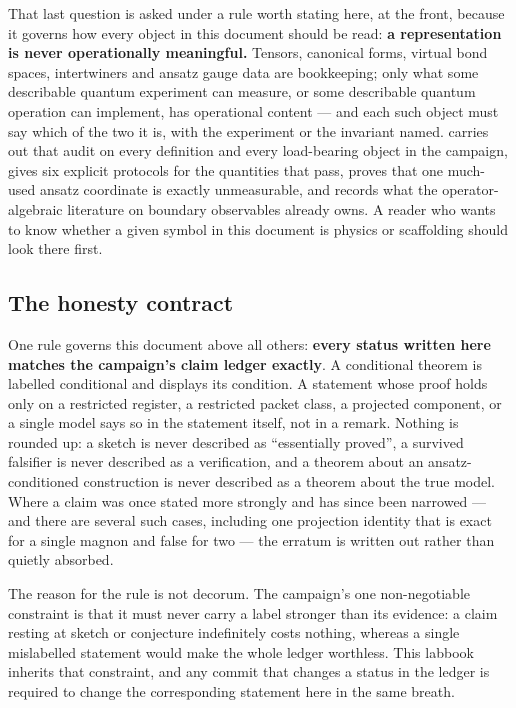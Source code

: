 That last question is asked under a rule worth stating here, at the front,
because it governs how every object in this document should be read: \textbf{a
representation is never operationally meaningful.} Tensors, canonical forms,
virtual bond spaces, intertwiners and ansatz gauge data are bookkeeping; only
what some describable quantum experiment can measure, or some describable
quantum operation can implement, has operational content --- and each such
object must say which of the two it is, with the experiment or the invariant
named.  carries out that audit on every definition
and every load-bearing object in the campaign, gives six explicit protocols for
the quantities that pass, proves that one much-used ansatz coordinate is exactly
unmeasurable, and records what the operator-algebraic literature on boundary
observables already owns. A reader who wants to know whether a given symbol in
this document is physics or scaffolding should look there first.

\subsection{The honesty contract}

One rule governs this document above all others: \textbf{every status written
here matches the campaign's claim ledger exactly}. A conditional theorem is
labelled conditional and displays its condition. A statement whose proof
holds only on a restricted register, a restricted packet class, a projected
component, or a single model says so in the statement itself, not in a
remark. Nothing is rounded up: a sketch is never described as ``essentially
proved'', a survived falsifier is never described as a verification, and a
theorem about an ansatz-conditioned construction is never described as a
theorem about the true model. Where a claim was once stated more strongly and
has since been narrowed --- and there are several such cases, including one
projection identity that is exact for a single magnon and false for two ---
the erratum is written out rather than quietly absorbed.

The reason for the rule is not decorum. The campaign's one non-negotiable
constraint is that it must never carry a label stronger than its evidence: a
claim resting at sketch or conjecture indefinitely costs nothing, whereas a
single mislabelled statement would make the whole ledger worthless. This
labbook inherits that constraint, and any commit that changes a status in the
ledger is required to change the corresponding statement here in the same
breath.
